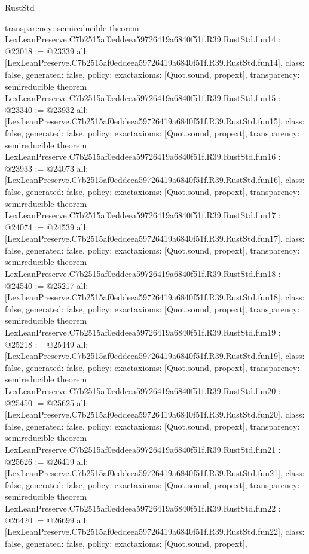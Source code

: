 \begin{lexlean}{RustStd}
\begin{coremodule}
{  transparency: semireducible
}
theorem LexLeanPreserve.C7b2515af0eddeea59726419a6840f51f.R39.RustStd.fun14 : @23018 := @23339 {
  all: [LexLeanPreserve.C7b2515af0eddeea59726419a6840f51f.R39.RustStd.fun14],
  class: false,
  generated: false,
  policy: exact{axioms: [Quot.sound, propext]},
  transparency: semireducible
}
theorem LexLeanPreserve.C7b2515af0eddeea59726419a6840f51f.R39.RustStd.fun15 : @23340 := @23932 {
  all: [LexLeanPreserve.C7b2515af0eddeea59726419a6840f51f.R39.RustStd.fun15],
  class: false,
  generated: false,
  policy: exact{axioms: [Quot.sound, propext]},
  transparency: semireducible
}
theorem LexLeanPreserve.C7b2515af0eddeea59726419a6840f51f.R39.RustStd.fun16 : @23933 := @24073 {
  all: [LexLeanPreserve.C7b2515af0eddeea59726419a6840f51f.R39.RustStd.fun16],
  class: false,
  generated: false,
  policy: exact{axioms: [Quot.sound, propext]},
  transparency: semireducible
}
theorem LexLeanPreserve.C7b2515af0eddeea59726419a6840f51f.R39.RustStd.fun17 : @24074 := @24539 {
  all: [LexLeanPreserve.C7b2515af0eddeea59726419a6840f51f.R39.RustStd.fun17],
  class: false,
  generated: false,
  policy: exact{axioms: [Quot.sound, propext]},
  transparency: semireducible
}
theorem LexLeanPreserve.C7b2515af0eddeea59726419a6840f51f.R39.RustStd.fun18 : @24540 := @25217 {
  all: [LexLeanPreserve.C7b2515af0eddeea59726419a6840f51f.R39.RustStd.fun18],
  class: false,
  generated: false,
  policy: exact{axioms: [Quot.sound, propext]},
  transparency: semireducible
}
theorem LexLeanPreserve.C7b2515af0eddeea59726419a6840f51f.R39.RustStd.fun19 : @25218 := @25449 {
  all: [LexLeanPreserve.C7b2515af0eddeea59726419a6840f51f.R39.RustStd.fun19],
  class: false,
  generated: false,
  policy: exact{axioms: [Quot.sound, propext]},
  transparency: semireducible
}
theorem LexLeanPreserve.C7b2515af0eddeea59726419a6840f51f.R39.RustStd.fun20 : @25450 := @25625 {
  all: [LexLeanPreserve.C7b2515af0eddeea59726419a6840f51f.R39.RustStd.fun20],
  class: false,
  generated: false,
  policy: exact{axioms: [Quot.sound, propext]},
  transparency: semireducible
}
theorem LexLeanPreserve.C7b2515af0eddeea59726419a6840f51f.R39.RustStd.fun21 : @25626 := @26419 {
  all: [LexLeanPreserve.C7b2515af0eddeea59726419a6840f51f.R39.RustStd.fun21],
  class: false,
  generated: false,
  policy: exact{axioms: [Quot.sound, propext]},
  transparency: semireducible
}
theorem LexLeanPreserve.C7b2515af0eddeea59726419a6840f51f.R39.RustStd.fun22 : @26420 := @26699 {
  all: [LexLeanPreserve.C7b2515af0eddeea59726419a6840f51f.R39.RustStd.fun22],
  class: false,
  generated: false,
  policy: exact{axioms: [Quot.sound, propext]},
}
\end{coremodule}
\end{lexlean}
